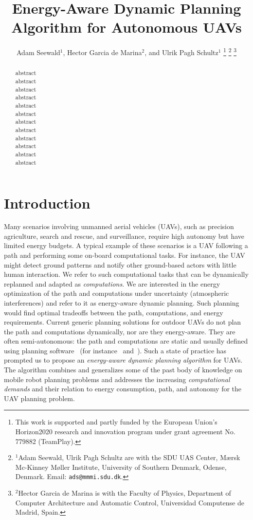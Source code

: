 \documentclass[letterpaper,10pt,conference]{ieeeconf}
\title{\LARGE \bf
Energy-Aware Dynamic Planning Algorithm for Autonomous UAVs
}
\author{
  Adam Seewald$^{1}$, Hector Garcia de Marina$^{2}$, and Ulrik Pagh Schultz$^{1}$
  \thanks{This work is supported and partly funded by the European Union's Horizon2020 research and innovation program under grant agreement No. 779882 (TeamPlay).
  }
  \thanks{$^{1}$Adam Seewald, Ulrik Pagh Schultz are with the SDU UAS Center, M{\ae}rsk Mc-Kinney M{\o}ller Institute, University of Southern Denmark, Odense, Denmark. Email: {\tt\small ads@mmmi.sdu.dk}.}
  \thanks{$^{2}$Hector Garcia de Marina is with the Faculty of Physics, Department of Computer Architecture and Automatic Control, Universidad Computense de Madrid, Spain.}
}
\theoremstyle{definition}
\begin{document}
\maketitle

\thispagestyle{empty}
\pagestyle{empty}

\begin{abstract}

  abstract\\
  abstract\\
  abstract\\
  abstract\\
  abstract\\
  abstract\\
  abstract\\
  abstract\\
  abstract\\
  abstract\\
  abstract\\
  abstract
\end{abstract}

%
\IEEEpeerreviewmaketitle


\section{Introduction}  %
\label{sec:intro}       %
Many scenarios involving unmanned aerial vehicles (UAVs), such as precision agriculture, search and rescue, and surveillance, require high autonomy but have limited energy budgets. A typical example of these scenarios is a UAV following a path and performing some on-board computational tasks. For instance, the UAV might detect ground patterns and notify other ground-based actors with little human interaction. We refer to such computational tasks that can be dynamically replanned and adapted as \emph{computations}. We are interested in the energy optimization of the path and computations under uncertainty (atmospheric interferences) and refer to it as energy-aware dynamic planning. Such planning would find optimal tradeoffs between the path, computations, and energy requirements. Current generic planning solutions for outdoor UAVs do not plan the path and computations dynamically, nor are they energy-aware. They are often semi-autonomous: the path and computations are static and usually defined using planning software~\cite{daponte2019review} (for instance~\cite{papa} and~\cite{px4}). Such a state of practice has prompted us to propose an \emph{energy-aware dynamic planning algorithm} for UAVs. The algorithm combines and generalizes some of the past body of knowledge on mobile robot planning problems and addresses the increasing \emph{computational demands} and their relation to energy consumption, path, and autonomy for the UAV planning problem.
\end{document}
